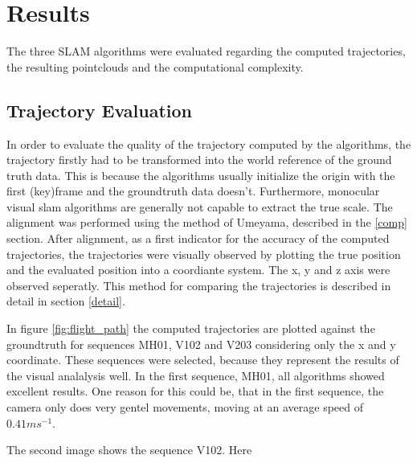 \chapter{Results}

The three SLAM algorithms were evaluated regarding the computed trajectories, the resulting pointclouds and
the computational complexity. 

\section{Trajectory Evaluation}

	In order to evaluate the quality of the trajectory computed by the algorithms, the trajectory firstly had to be 
	transformed into the world reference of the ground truth data. This is because the algorithms usually initialize
	the origin with the first (key)frame and the groundtruth data doesn't. Furthermore, monocular visual slam algorithms 
	are generally not capable to extract the true scale. The alignment was performed using the method of Umeyama, described
	in the \ref{comp} section. 
	After alignment, as a first indicator for the accuracy of the computed trajectories, the trajectories were visually observed by 
	plotting the true position and the evaluated position into a coordiante system. The x, y and z axis were observed seperatly. This method 
    for comparing the trajectories is described in detail in section \ref{detail}. 	
	
	In figure \ref{fig:flight_path} the computed trajectories are plotted against the groundtruth for sequences MH01, V102 and V203 considering only the 
	x and y coordinate. These sequences 
	were selected, because they represent the results of the visual analalysis well. In the first sequence, MH01, all algorithms showed excellent results. 
	One reason for this could be, that in the first sequence, the camera only does very gentel movements, moving at an average speed of $0.41 ms^{-1}$. 
	
	The second image shows the sequence V102. Here
	

